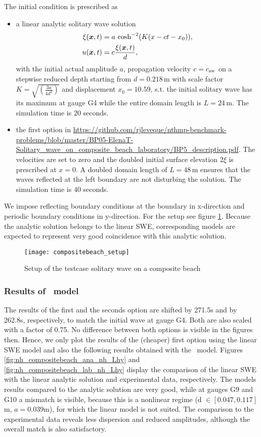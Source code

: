 The initial condition is prescribed as 
\begin{itemize}
 \item a linear analytic solitary wave solution
\begin{align}
\xi(\boldsymbol{x},t)&=a \ \text{cosh}^{-2}(K(x-ct-x_0)), \\
u(\boldsymbol{x},t)&=c\frac{\xi(\boldsymbol{x},t)}{d},
\end{align}
with the initial actual amplitude $a$, propagation velocity $c=c_{\text{sw}}$ on a stepwise reduced depth starting from $d=0.218 \, \text{m}$ with scale factor $K=\sqrt{\left(\frac{3a}{4d^3}\right)}$ and displacement $x_0=10.59$, s.t. the initial solitary wave has its maximum at gauge G4 while the entire domain length is $L=24 \, \text{m}$. The simulation time is $20$ seconds. 
 \item the first option in \url{https://github.com/rjleveque/nthmp-benchmark-problems/blob/master/BP05-ElenaT-Solitary_wave_on_composite_beach_laboratory/BP5_description.pdf}. The velocities are set to zero and the doubled initial surface elevation $2\xi$ is prescribed at $x=0$. A doubled domain length of $L=48 \, \text{m}$ ensures that the waves reflected at the left boundary are not disturbing the solution. The simulation time is $40$ seconds.
\end{itemize}
We impose reflecting boundary conditions at the boundary in x-direction and periodic boundary conditions in y-direction. For the setup see figure \ref{fig:compositebeach_setup}. 
Because the analytic solution belongs to the linear SWE, corresponding models are expected to represent very good coincidence with this analytic solution.

\begin{figure}[htbp]
\texttt{[image: compositebeach\_setup]}
\caption{Setup of the testcase solitary wave on a composite beach}
\label{fig:compositebeach_setup}
\end{figure}

\subsubsection{Results of \nh\ model}
The results of the first and the seconds option are shifted by 271.5s and by 262.8s, respectively, to match the initial wave at gauge G4. Both are also scaled with a factor of 0.75.
No difference between both options is visible in the figures then. Hence, we only plot the results of the (cheaper) first option using the linear SWE model and also the following results obtained with the \nh\ model.
Figures \eqref{fig:nh_compositebeach_ana_nh_Lhy} and \eqref{fig:nh_compositebeach_lab_nh_Lhy} display the comparison of the linear SWE with the linear analytic solution and experimental data, respectively.
The models results compared to the analytic solution are very good, while at gauges G9 and G10 a mismatch is visible, because this is a nonlinear regime (d $\in [0.047,0.117]$m, $a=0.039$m), for which the linear model is not suited.
The comparison to the experimental data reveals less dispersion and reduced amplitudes, although the overall match is also satisfactory.

